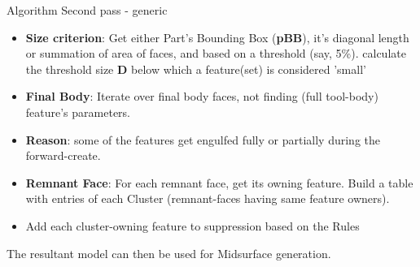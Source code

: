 \begin{frame}{Algorithm Second pass - generic}

	\begin{itemize}[noitemsep,label=\textbullet,topsep=2pt,parsep=2pt,partopsep=2pt]
		\item {\bf Size criterion}: Get either Part's Bounding Box ({\bf pBB}), it's diagonal length or summation of area of faces, and based on a threshold (say, 5\%). calculate the threshold size {\bf D} below which a feature(set) is considered  'small'
		\item {\bf Final Body}: Iterate over final body faces, not finding (full tool-body) feature's parameters. 
		\item {\bf Reason}: some of the features get engulfed fully or partially during the forward-create.
		\item {\bf Remnant Face}: For each remnant face, get its owning feature. Build a table with entries of each Cluster (remnant-faces having same feature owners).
		\item Add each cluster-owning feature to suppression based on the Rules 
		\end{itemize}

The resultant model can then be used for Midsurface generation.

\end{frame}

